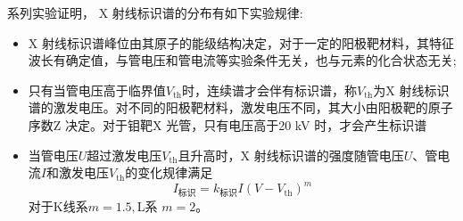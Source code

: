 \documentclass[10.5pt]{article}
\renewcommand{\=}[1]{\stackrel{#1}{=}} %
\theoremstyle{definition}
\theoremstyle{remark}
\begin{document}
	系列实验证明， X 射线标识谱的分布有如下实验规律:
	\begin{itemize}
		\item X 射线标识谱峰位由其原子的能级结构决定，对于一定的阳极靶材料，其特征波长有确定值，与管电压和管电流等实验条件无关，也与元素的化合状态无关;
		\item 只有当管电压高于临界值$V_{\text{th}}$时，连续谱才会伴有标识谱，称$V_{\text{th}}$为X 射线标识谱的激发电压。对不同的阳极靶材料，激发电压不同，其大小由阳极靶的原子序数Z 决定。对于钼靶X 光管，只有电压高于20 kV 时，才会产生标识谱
		\item 当管电压$U$超过激发电压$V_{\text{th}}$且升高时，X 射线标识谱的强度随管电压$U$、管电流$I$和激发电压$V_{\text{th}}$的变化规律满足
		\begin{equation}
			I_{\text{标识}}=k_{\text{标识}}I(V-V_{\text{th}})^m
		\end{equation}
		对于K线系$m=1.5,$L系 $m=2$。
	\end{itemize}
\end{document}
